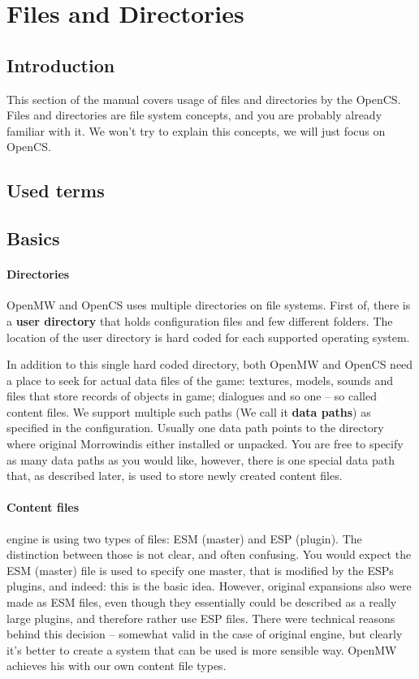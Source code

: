 \section{Files and Directories}
\subsection{Introduction}
This section of the manual covers usage of files and directories by the OpenCS. Files and directories are file system concepts,
and you are probably already familiar with it. We won't try to explain this concepts, we will just focus on Open{CS}.

\subsection{Used terms} %

\subsection{Basics}

\paragraph{Directories}
Open{MW} and Open{CS} uses multiple directories on file systems. First of, there is a \textbf{user directory} that holds configuration
files and few different folders. The location of the user directory is hard coded for each supported operating system.

In addition to this single hard coded directory, both Open{MW} and Open{CS} need a place to seek for actual data files of the game:
textures, models, sounds and files that store records of objects in game; dialogues and so one -- so called content files. We support
multiple such paths (We call it \textbf{data paths}) as specified in the configuration. Usually one data path points to the directory
where original Morrowind\texttrademark is either installed or unpacked. You are free to specify as many data paths as you would like,
however, there is one special data path that, as described later, is used to store newly created content files.

\paragraph{Content files}
\BS \MW engine is using two types of files: ESM (master) and ESP (plugin). The distinction between those
is not clear, and often confusing. You would expect the ESM (master) file is used to specify one master, that is modified by the ESPs plugins,
and indeed: this is the basic idea. However, original expansions also were made as ESM files, even though they essentially could be
described as a really large plugins, and therefore rather use ESP files. There were technical reasons behind this decision -- somewhat valid
in the case of original engine, but clearly it's better to create a system that can be used is more sensible way. Open{MW} achieves
his with our own content file types.

